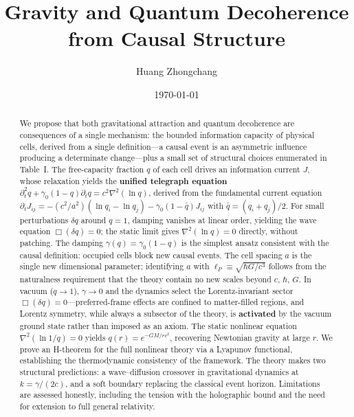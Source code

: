 \documentclass[aps,prd,twocolumn,showpacs,superscriptaddress,preprintnumbers]{revtex4-2}
\begin{document}
\title{Gravity and Quantum Decoherence from Causal Structure}

\author{Huang Zhongchang}

\date{\today}

\begin{abstract}
We propose that both gravitational attraction and quantum decoherence are consequences of a single mechanism: the bounded information capacity of physical cells, derived from a single definition---a causal event is an asymmetric influence producing a determinate change---plus a small set of structural choices enumerated in Table~I.
The free-capacity fraction $q$ of each cell drives an information current $J$, whose relaxation yields the \textbf{unified telegraph equation}
$\partial_t^2 q + \gamma_0(1-q)\partial_t q = c^2\nabla^2(\ln q)$,
derived from the fundamental current equation
$\partial_t J_{ij} = -(c^2/a^2)(\ln q_i - \ln q_j) - \gamma_0(1-\bar{q})J_{ij}$
with $\bar{q}=(q_i+q_j)/2$.
For small perturbations $\delta q$ around $q=1$, damping vanishes at linear order, yielding the wave equation $\Box(\delta q)=0$; the static limit gives $\nabla^2(\ln q)=0$ directly, without patching.
The damping $\gamma(q)=\gamma_0(1-q)$ is the simplest ansatz consistent with the causal definition: occupied cells block new causal events.
The cell spacing $a$ is the single new dimensional parameter; identifying $a$ with $\ell_P\equiv\sqrt{\hbar G/c^3}$ follows from the naturalness requirement that the theory contain no new scales beyond $c$, $\hbar$, $G$.
In vacuum ($q\to1$), $\gamma\to0$ and the dynamics select the Lorentz-invariant sector $\Box(\delta q)=0$---preferred-frame effects are confined to matter-filled regions, and Lorentz symmetry, while always a subsector of the theory, is \textbf{activated} by the vacuum ground state rather than imposed as an axiom.
The static nonlinear equation $\nabla^2(\ln 1/q)=0$ yields $q(r)=e^{-GM/rc^2}$, recovering Newtonian gravity at large $r$.
We prove an H-theorem for the full nonlinear theory via a Lyapunov functional, establishing the thermodynamic consistency of the framework.
The theory makes two structural predictions: a wave--diffusion crossover in gravitational dynamics at $k=\gamma/(2c)$, and a soft boundary replacing the classical event horizon.
Limitations are assessed honestly, including the tension with the holographic bound and the need for extension to full general relativity.
\end{abstract}

\maketitle
\end{document}
